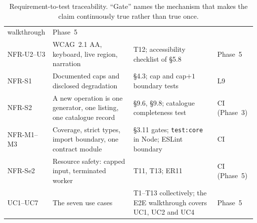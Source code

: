 \documentclass[11pt,a4paper]{article}
\newcommand{\ct}[1]{\texttt{#1}}
\begin{document}
\begin{table}[H]
\begin{tabular}{@{}L{2.5cm}L{6.0cm}L{4.0cm}L{3.0cm}@{}}
walkthrough & Phase~5 \\
NFR-U2--U3 & WCAG~2.1 AA, keyboard, live region, narration & T12; accessibility checklist of
\S5.8 & Phase~5 \\
NFR-S1 & Documented caps and disclosed degradation & \S4.3; cap and cap$+1$ boundary tests &
L9 \\
NFR-S2 & A new operation is one generator, one listing, one catalogue record & \S9.6,
\S9.8; catalogue completeness test & CI (Phase~3) \\
NFR-M1--M3 & Coverage, strict types, import boundary, one contract module & \S3.11 gates;
\ct{test:core} in Node; ESLint boundary & CI \\
NFR-Se2 & Resource safety: capped input, terminated worker & T11, T13; ER11 & CI (Phase~5) \\
UC1--UC7 & The seven use cases & T1--T13 collectively; the E2E walkthrough covers UC1, UC2 and
UC4 & Phase~5 \\
\bottomrule
\end{tabular}
\caption{Requirement-to-test traceability. ``Gate'' names the mechanism that makes the claim
continuously true rather than true once.}
\label{tab:trace}
\end{table}
\end{document}
